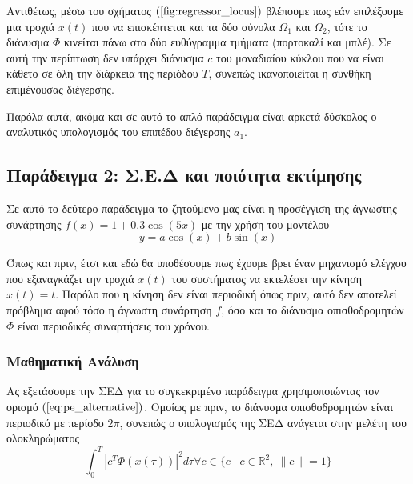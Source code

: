 Αντιθέτως, μέσω του σχήματος $(\ref{fig:regressor_locus})$ βλέπουμε πως εάν επιλέξουμε μια τροχιά $x(t)$ που να επισκέπτεται και τα δύο σύνολα $\Omega_1$ και $\Omega_2$, τότε το διάνυσμα $\varPhi$ κινείται πάνω στα δύο ευθύγραμμα τμήματα (πορτοκαλί και μπλέ). Σε αυτή την περίπτωση δεν υπάρχει διάνυσμα $c$ του μοναδιαίου κύκλου που να είναι κάθετο σε όλη την διάρκεια της περιόδου $T$, συνεπώς ικανοποιείται η συνθήκη επιμένουσας διέγερσης.

Παρόλα αυτά, ακόμα και σε αυτό το απλό παράδειγμα είναι αρκετά δύσκολος ο αναλυτικός υπολογισμός του επιπέδου διέγερσης $a_1$.

\subsection{Παράδειγμα 2: Σ.Ε.Δ και ποιότητα εκτίμησης}
Σε αυτό το δεύτερο παράδειγμα το ζητούμενο μας είναι η προσέγγιση της άγνωστης συνάρτησης $f(x) = 1 + 0.3\cos(5x)$ με την χρήση του μοντέλου
\begin{equation*}
	y = a \cos(x) + b \sin(x)
\end{equation*}

Όπως και πριν, έτσι και εδώ θα υποθέσουμε πως έχουμε βρει έναν μηχανισμό ελέγχου που εξαναγκάζει την τροχιά $x(t)$ του συστήματος να εκτελέσει την κίνηση $x(t) = t$. Παρόλο που η κίνηση δεν είναι περιοδική όπως πριν, αυτό δεν αποτελεί πρόβλημα αφού τόσο η άγνωστη συνάρτηση $f$, όσο και το διάνυσμα οπισθοδρομητών $\varPhi$ είναι περιοδικές συναρτήσεις του χρόνου.

\subsubsection{Μαθηματική Ανάλυση}
Ας εξετάσουμε την ΣΕΔ για το συγκεκριμένο παράδειγμα χρησιμοποιώντας τον ορισμό $(\ref{eq:pe_alternative})$. Ομοίως με πριν, το διάνυσμα οπισθοδρομητών είναι περιοδικό με περίοδο $2\pi$, συνεπώς ο υπολογισμός της ΣΕΔ ανάγεται στην μελέτη του ολοκληρώματος
\begin{equation*}
	\int_{0}^{T} \left| c^T \varPhi(x(\tau)) \right|^2 d\tau
	\forall c \in
	\{c \mid c \in \mathbb{R}^2, \: \|c\| =1 \}
\end{equation*}


